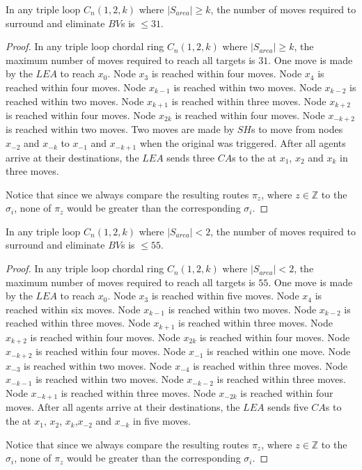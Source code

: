  
 \begin{theorem}
In any triple loop   $C_n(1,2,k)$ where $\left\vert{S_{area}}\right\vert \ge k$,  the number of moves required to surround and eliminate $BV$s is $\leq31$.
\end{theorem}
 \begin{proof}
In any triple loop chordal ring $C_n(1,2,k)$ where $\left\vert{S_{area}}\right\vert \ge k$, the maximum number of moves required to reach all targets is $31$. 
 One move is made by the $LEA$ to reach $x_0$. Node $x_{3}$ is reached within four moves.
  Node $x_{4}$ is reached within four moves.
  Node $x_{k-1}$ is reached within two moves.
  Node $x_{k-2}$ is reached within two moves.
  Node $x_{k+1}$ is reached within three moves.
  Node $x_{k+2}$ is reached within four moves.
  Node $x_{2k}$ is reached within four moves.
  Node $x_{-k+2}$ is reached within two moves.
 Two moves are made by $SH$s to move from  nodes $x_{-2}$ and $x_{-k}$ to $x_{-1}$ and $x_{-k+1}$  when the original \bv was triggered.
 After all agents arrive at their destinations, the $LEA$ sends three $CA$s to the \bvs at $x_{1}$, $x_{2}$ and $x_{k}$ in three moves.

Notice that since we always compare the resulting routes $\pi_z$, where $z \in \mathbb{Z}$  to the  $\sigma_i$, none of $\pi_z$ would be greater than the corresponding $\sigma_i$. 
\end{proof}

\begin{theorem}
In any triple loop   $C_n(1,2,k)$ where $\left\vert{S_{area}}\right\vert < 2$,  the number of moves required to surround and eliminate $BV$s is $\leq55$.
\end{theorem}
 \begin{proof}
In any triple loop chordal ring $C_n(1,2,k)$ where $\left\vert{S_{area}}\right\vert <2$, the maximum number of moves required to reach all targets is $55$. 
 One move is made by the $LEA$ to reach $x_0$.
  Node $x_{3}$ is reached within five moves.
  Node $x_{4}$ is reached within six moves.
  Node $x_{k-1}$ is reached within two moves.
  Node $x_{k-2}$ is reached within three moves.
  Node $x_{k+1}$ is reached within three moves.
  Node $x_{k+2}$ is reached within four moves.
  Node $x_{2k}$ is reached within four moves.
  Node $x_{-k+2}$ is reached within four moves.
  Node $x_{-1}$ is reached within one move.
  Node $x_{-3}$ is reached within two moves.
  Node $x_{-4}$ is reached within three moves.
  Node $x_{-k-1}$ is reached within two moves.
  Node $x_{-k-2}$ is reached within three moves.
  Node $x_{-k+1}$ is reached within three moves.
  Node $x_{-2k}$ is reached within four moves.
 After all agents arrive at their destinations, the $LEA$ sends five $CA$s to the \bvs at $x_{1}$, $x_{2}$, $x_{k}$,$x_{-2}$ and $x_{-k}$ in five moves.

Notice that since we always compare the resulting routes $\pi_z$, where $z \in \mathbb{Z}$  to the  $\sigma_i$, none of $\pi_z$ would be greater than the corresponding $\sigma_i$. 
\end{proof}

